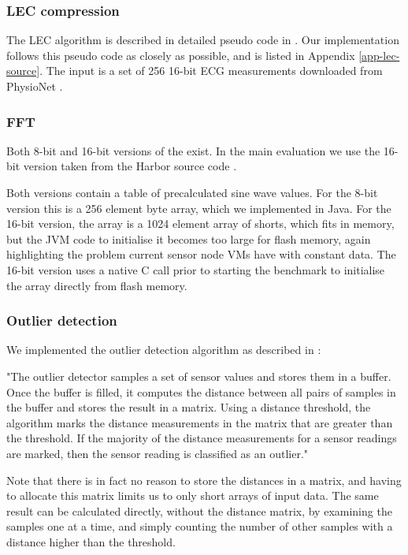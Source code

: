 \subsubsection{LEC compression}
The LEC algorithm is described in detailed pseudo code in \cite{Marcelloni:2009ja}. Our implementation follows this pseudo code as closely as possible, and is listed in Appendix \ref{app-lec-source}. The input is a set of 256 16-bit ECG measurements downloaded from PhysioNet \cite{physionet-ecg-data}.


\subsubsection{FFT}
Both 8-bit and 16-bit versions of the  exist. In the main evaluation we use the 16-bit version taken from the Harbor source code \cite{sos-operating-system}.

Both versions contain a table of precalculated sine wave values. For the 8-bit version this is a 256 element byte array, which we implemented in Java. For the 16-bit version, the array is a 1024 element array of shorts, which fits in memory, but the JVM code to initialise it becomes too large for flash memory, again highlighting the problem current sensor node VMs have with constant data. The 16-bit version uses a native C call prior to starting the benchmark to initialise the array directly from flash memory.

\subsubsection{Outlier detection}
We implemented the outlier detection algorithm as described in \cite{Kumar:2007ge}:

\begin{displayquote}
"The outlier detector samples a set of sensor values and stores them in a buffer. Once the buffer is filled, it computes the distance between all pairs of samples in the buffer and stores the result in a matrix. Using a distance threshold, the algorithm marks the distance measurements in the matrix that are greater than the threshold. If the majority of the distance measurements for a sensor readings are marked, then the sensor reading is classified as an outlier."
\end{displayquote}

Note that there is in fact no reason to store the distances in a matrix, and having to allocate this matrix limits us to only short arrays of input data. The same result can be calculated directly, without the distance matrix, by examining the samples one at a time, and simply counting the number of other samples with a distance higher than the threshold.

